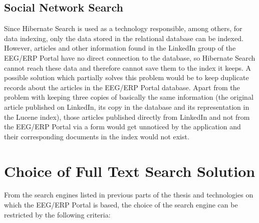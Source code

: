 \subsection{Social Network Search}
Since Hibernate Search is used as a technology responsible, among others, for data indexing, only the data stored in the relational database can be indexed. 
However, articles and other information found in the LinkedIn group of the EEG/ERP Portal have no direct connection to the database, so Hibernate Search cannot reach these data and therefore cannot save them to the index it keeps. 
A possible solution which partially solves this problem would be to keep duplicate records about the articles in the EEG/ERP Portal database. 
Apart from the problem with keeping three copies of basically the same information (the original article published on LinkedIn, its copy in the database and its representation in the Lucene index), those articles published directly from LinkedIn and not from the EEG/ERP Portal via a form would get unnoticed by the application and their corresponding documents in the index would not exist.


\section{Choice of Full Text Search Solution}

From the search engines listed in previous parts of the thesis and technologies on which the EEG/ERP Portal is based, the choice of the search engine can be restricted by the following criteria:

